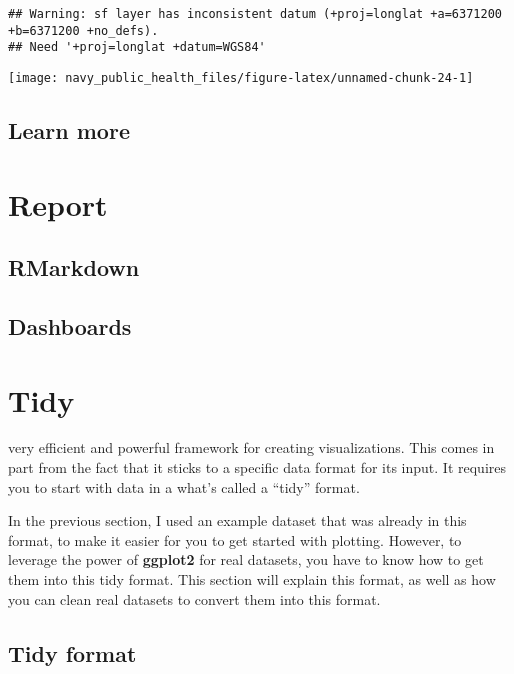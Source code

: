 \documentclass[]{tufte-book}
\begin{document}
\begin{verbatim}
## Warning: sf layer has inconsistent datum (+proj=longlat +a=6371200 +b=6371200 +no_defs).
## Need '+proj=longlat +datum=WGS84'
\end{verbatim}

\texttt{[image: navy\_public\_health\_files/figure-latex/unnamed-chunk-24-1]}

\hypertarget{learn-more-2}{%
\section{Learn more}\label{learn-more-2}}

\hypertarget{report}{%
\chapter{Report}\label{report}}

\hypertarget{rmarkdown}{%
\section{RMarkdown}\label{rmarkdown}}

\hypertarget{dashboards}{%
\section{Dashboards}\label{dashboards}}

\hypertarget{tidy}{%
\chapter{Tidy}\label{tidy}}

 very efficient and powerful
framework for
creating visualizations. This comes in part from the fact that it sticks
to a specific data format for its input. It requires you to start with
data in a what's called a ``tidy'' format.

In the previous section, I used an example dataset that was already in this
format, to make it easier for you to get started with plotting. However,
to leverage the power of \textbf{ggplot2} for real datasets, you have to know
how to get them into this tidy format. This section will explain this format,
as well as how you can clean real datasets to convert them into this format.

\hypertarget{tidy-format}{%
\section{Tidy format}\label{tidy-format}}
\end{document}
